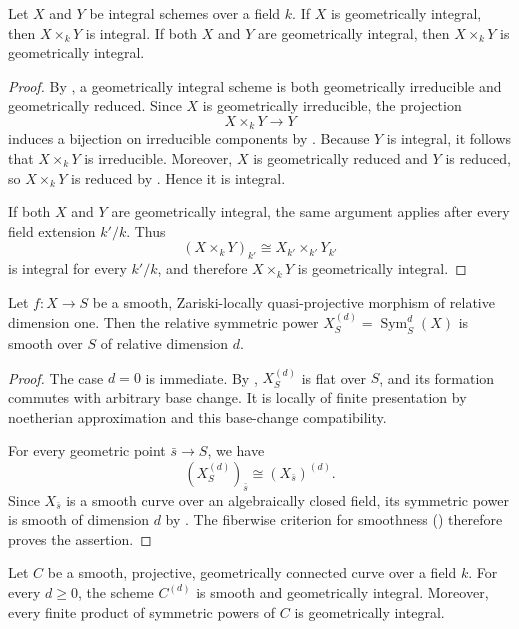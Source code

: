 \begin{theorem}\label{theorem:int_geoint_implies_productint}
Let $X$ and $Y$ be integral schemes over a field $k$. If $X$ is geometrically
integral, then $X \times_k Y$ is integral. If both $X$ and $Y$ are
geometrically integral, then $X \times_k Y$ is geometrically integral.
\end{theorem}
\begin{proof}
By , a geometrically integral scheme is both geometrically
irreducible and geometrically reduced. Since $X$ is geometrically irreducible,
the projection
\[
X\times_k Y\longrightarrow Y
\]
induces a bijection on irreducible components by .
Because $Y$ is integral, it follows that $X\times_k Y$ is irreducible.
Moreover, $X$ is geometrically reduced and $Y$ is reduced, so
$X\times_k Y$ is reduced by . Hence it is integral.

If both $X$ and $Y$ are geometrically integral, the same argument applies
after every field extension $k'/k$. Thus
\[
(X\times_kY)_{k'}\cong X_{k'}\times_{k'}Y_{k'}
\]
is integral for every $k'/k$, and therefore $X\times_kY$ is geometrically
integral.
\end{proof}

\begin{prop}\label{prop:relative_symmetric_power_smooth}
Let $f:X\to S$ be a smooth, Zariski-locally quasi-projective morphism of
relative dimension one. Then the relative symmetric power
$X_S^{(d)}=\operatorname{Sym}_S^d(X)$ is smooth over $S$ of relative dimension
$d$.
\end{prop}

\begin{proof}
The case $d=0$ is immediate. By
, $X_S^{(d)}$ is flat over $S$,
and its formation commutes with arbitrary base change. It is locally of
finite presentation by noetherian approximation and this base-change
compatibility.

For every geometric point $\bar s\to S$, we have
\[
(X_S^{(d)})_{\bar s}\cong(X_{\bar s})^{(d)}.
\]
Since $X_{\bar s}$ is a smooth curve over an algebraically closed field,
its symmetric power is smooth of dimension $d$ by
\cite[Chapter~III, Proposition~3.2]{milneAV}.
The fiberwise criterion for smoothness () therefore proves
the assertion.
\end{proof}

\begin{cor}\label{cor:symmetric_power_curve_geometry}
Let $C$ be a smooth, projective, geometrically connected curve over a field
$k$. For every $d\geq 0$, the scheme $C^{(d)}$ is smooth and geometrically
integral. Moreover, every finite product of symmetric powers of $C$ is
geometrically integral.
\end{cor}

